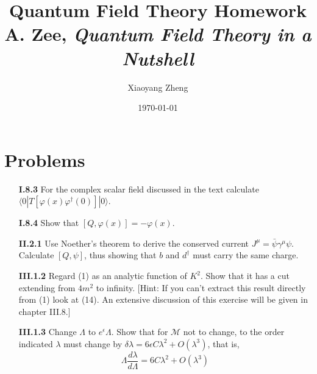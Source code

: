 \documentclass[12pt]{article}
\title{Quantum Field Theory Homework \\ \large A. Zee, \textit{Quantum Field Theory in a Nutshell}}
\author{Xiaoyang Zheng} %
\date{\today}
\begin{document}
\maketitle

\section*{Problems}
\begin{enumerate}

    \item[\textbf{I.8.3}] For the complex scalar field discussed in the text calculate $\langle 0 | T[\varphi(x)\varphi^\dagger(0)] | 0 \rangle$.

    \item[\textbf{I.8.4}] Show that $[Q, \varphi(x)] = -\varphi(x)$.

    \item[\textbf{II.2.1}] Use Noether's theorem to derive the conserved current $J^\mu = \bar{\psi}\gamma^\mu\psi$. Calculate $[Q, \psi]$, thus showing that $b$ and $d^\dagger$ must carry the same charge.

    \item[\textbf{III.1.2}] Regard (1) as an analytic function of $K^2$. Show that it has a cut extending from $4m^2$ to infinity. [Hint: If you can't extract this result directly from (1) look at (14). An extensive discussion of this exercise will be given in chapter III.8.]

    \item[\textbf{III.1.3}] Change $\Lambda$ to $e^\epsilon \Lambda$. Show that for $\mathcal{M}$ not to change, to the order indicated $\lambda$ must change by $\delta\lambda = 6\epsilon C\lambda^2 + O(\lambda^3)$, that is,
    $$
    \Lambda \frac{d\lambda}{d\Lambda} = 6C\lambda^2 + O(\lambda^3)
    $$

\end{enumerate}
\end{document}
